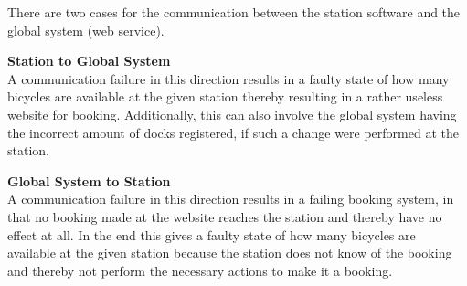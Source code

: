 \begin{description}[style=nextline]
There are two cases for the communication between the station software and the global system (web service).

\textbf{Station to Global System}\\
A communication failure in this direction results in a faulty state of how many bicycles are available at the given station thereby resulting in a rather useless website for booking.
Additionally, this can also involve the global system having the incorrect amount of docks registered, if such a change were performed at the station.

\textbf{Global System to Station}\\
A communication failure in this direction results in a failing booking system, in that no booking made at the website reaches the station and thereby have no effect at all.
In the end this gives a faulty state of how many bicycles are available at the given station because the station does not know of the booking and thereby not perform the necessary actions to make it a booking.

\end{description}

